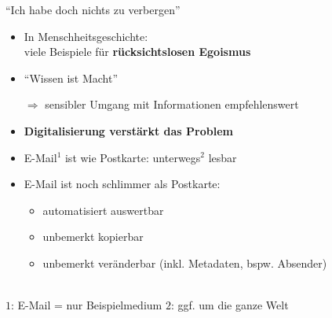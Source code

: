 \documentclass{beamer}
\begin{document}

\begin{frame}{"`Ich habe doch nichts zu verbergen"'}
  
  \begin{itemize}
   \item  In Menschheitsgeschichte:\\
   viele Beispiele für \textbf{rücksichtslosen Egoismus}
   \item "`Wissen ist Macht"'
   \item[$\Rightarrow$] sensibler Umgang mit Informationen empfehlenswert\\[5mm]
   
   \pause

   \item \textbf{Digitalisierung verstärkt das Problem}
   \item E-Mail${}^{1}$ ist wie Postkarte: unterwegs${}^{2}$ lesbar
   \item E-Mail ist noch schlimmer als Postkarte:
   \begin{itemize}
    \item automatisiert auswertbar
    \item unbemerkt kopierbar
    \item unbemerkt veränderbar (inkl. Metadaten, bspw. Absender)
   \end{itemize}
  \end{itemize}
  
  ~\\[5mm]
  {\tiny $1$: E-Mail = nur Beispielmedium \qquad $2$: ggf. um die ganze Welt }

\end{frame}

\end{document}
